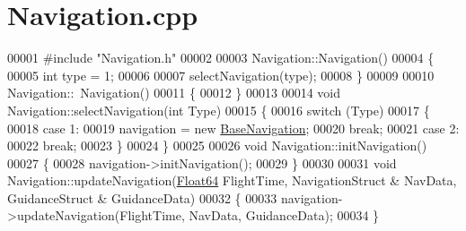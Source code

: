 \hypertarget{_navigation_8cpp_source}{}\section{Navigation.\+cpp}
\label{_navigation_8cpp_source}

\begin{DoxyCode}
00001 \textcolor{preprocessor}{#include "Navigation.h"}
00002 
00003 Navigation::Navigation()
00004 \{
00005     \textcolor{keywordtype}{int} type = 1;
00006 
00007     selectNavigation(type);
00008 \}
00009 
00010 Navigation::~Navigation()
00011 \{
00012 \}
00013 
00014 \textcolor{keywordtype}{void} Navigation::selectNavigation(\textcolor{keywordtype}{int} Type)
00015 \{
00016     \textcolor{keywordflow}{switch} (Type)
00017     \{
00018     \textcolor{keywordflow}{case} 1:
00019         navigation = \textcolor{keyword}{new} \hyperlink{class_base_navigation}{BaseNavigation};
00020         \textcolor{keywordflow}{break};
00021     \textcolor{keywordflow}{case} 2:
00022         \textcolor{keywordflow}{break};
00023     \}
00024 \}
00025 
00026 \textcolor{keywordtype}{void} Navigation::initNavigation()
00027 \{
00028     navigation->initNavigation();
00029 \}
00030 
00031 \textcolor{keywordtype}{void} Navigation::updateNavigation(\hyperlink{group___tools_ga3f1431cb9f76da10f59246d1d743dc2c}{Float64} FlightTime, NavigationStruct & NavData, GuidanceStruct & 
      GuidanceData)
00032 \{
00033     navigation->updateNavigation(FlightTime, NavData, GuidanceData);
00034 \}
\end{DoxyCode}
